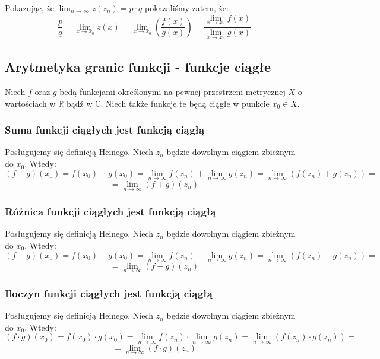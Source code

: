\documentclass{article}
\begin{document}
Pokazując, że \(\lim_{n \to \infty} z(z_n) = p \cdot q\) pokazaliśmy zatem, że:
\begin{equation*}
    \frac{p}{q} = \lim_{x \to x_0} z(x) = \lim_{x \to x_0} (\frac{f(x)} {g(x)}) = \frac{\lim_{x \to x_0} f(x)} {\lim_{x \to x_0} g(x)}
\end{equation*}



\subsection{Arytmetyka granic funkcji - funkcje ciągłe}

Niech \(f\) oraz \(g\) bedą funkcjami określonymi na pewnej przestrzeni metrycznej \(X\) o wartościach
w \(\mathbb{R}\) bądź w \(\mathbb{C}\). Niech także funkcje te będą ciągłe w punkcie \(x_0 \in X\).

\subsubsection{Suma funkcji ciągłych jest funkcją ciągłą}
Posługujemy się definicją Heinego. Niech \(z_n\) będzie dowolnym ciągiem zbieżnym do \(x_0\). Wtedy:
\begin{equation*}
    (f+g)(x_0) = f(x_0) + g(x_0) = \lim_{n \to \infty} f(z_n) + \lim_{n \to \infty} g(z_n) = \lim_{n \to \infty} (f(z_n) + g(z_n)) = 
\end{equation*}
\begin{equation*}
    = \lim_{n \to \infty} (f+g)(z_n)
\end{equation*}

\subsubsection{Różnica funkcji ciągłych jest funkcją ciągłą}
Posługujemy się definicją Heinego. Niech \(z_n\) będzie dowolnym ciągiem zbieżnym do \(x_0\). Wtedy:
\begin{equation*}
    (f-g)(x_0) = f(x_0) - g(x_0) = \lim_{n \to \infty} f(z_n) - \lim_{n \to \infty} g(z_n) = \lim_{n \to \infty} (f(z_n) - g(z_n)) = 
\end{equation*}
\begin{equation*}
    = \lim_{n \to \infty} (f-g)(z_n)
\end{equation*}

\subsubsection{Iloczyn funkcji ciągłych jest funkcją ciągłą}
Posługujemy się definicją Heinego. Niech \(z_n\) będzie dowolnym ciągiem zbieżnym do \(x_0\). Wtedy:
\begin{equation*}
    (f \cdot g)(x_0) = f(x_0) \cdot g(x_0) = \lim_{n \to \infty} f(z_n) \cdot \lim_{n \to \infty} g(z_n) = \lim_{n \to \infty} (f(z_n) \cdot g(z_n)) = 
\end{equation*}
\begin{equation*}
    = \lim_{n \to \infty} (f \cdot g)(z_n)
\end{equation*} 
\end{document}
